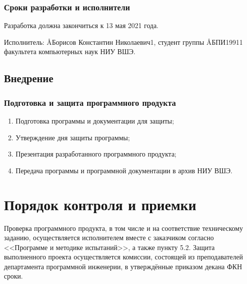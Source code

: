 \documentclass[a4paper,12pt,reqno]{article}
\begin{document}
      \subsubsection*{Сроки разработки и исполнители}
      Разработка должна закончиться к 13 мая 2021 года.

      Исполнитель: \AA{Борисов Константин Николаевич}{1}, студент группы \AA{БПИ199}{11} факультета компьютерных наук НИУ ВШЭ.
    \subsection{Внедрение}
      \subsubsection*{Подготовка и защита программного продукта}
      \begin{enumerate}
        \item Подготовка программы и документации для защиты;
        \item Утверждение дня защиты программы;
        \item Презентация разработанного программного продукта;
        \item Передача программы и программной документации в архив НИУ ВШЭ.
      \end{enumerate}




  \section{Порядок контроля и приемки}
  Проверка программного продукта, в том числе и на соответствие техническому заданию,
  осуществляется исполнителем вместе с заказчиком согласно <<Программе и методике испытаний>>, а также пункту 5.2.
  Защита выполненного проекта осуществляется комиссии, состоящей из преподавателей департамента программной инженерии,
  в утверждённые приказом декана ФКН сроки.

  \begin{CRTbibliography}
  \end{CRTbibliography}

  \CRTlistRegistration
\end{document}
